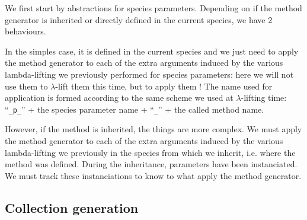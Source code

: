 We first start by abstractions for species parameters. Depending on if
the method generator is inherited or directly defined in the current
species, we have 2 behaviours.

In the simples case, it is defined in the current species and we just
need to apply the method generator to each of the extra arguments
induced by the various lambda-lifting we previously performed for
species parameters: here we will not use them to $\lambda$-lift them
this time, but to apply them ! The name used for application is formed
according to the same scheme we used at $\lambda$-lifting time:
``{\tt \_p\_}'' + the species parameter name + ``{\tt \_}'' + the
called method name.

However, if the method is inherited, the things are more complex. We
must apply the method generator to each of the extra arguments induced
by the various lambda-lifting we previously in the species from which
we inherit, i.e. where the method was defined. During the inheritance,
parameters have been instanciated. We must track these instanciations
to know to what apply the method generator.

\subsection{Collection generation}
